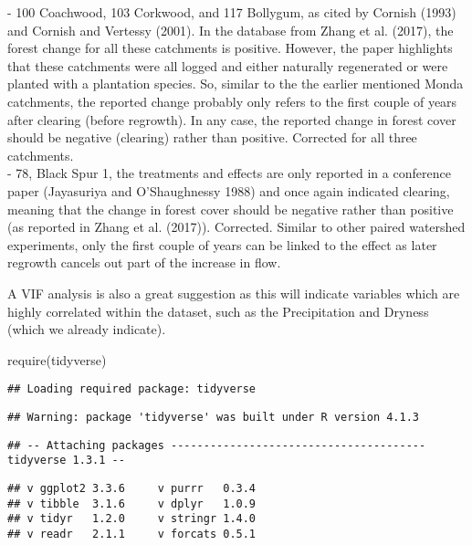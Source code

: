\documentclass[]{elsarticle} %
\newenvironment{Shaded}{\begin{snugshade}}{\end{snugshade}}
\newcommand{\FunctionTok}[1]{\textcolor[rgb]{0.00,0.00,0.00}{#1}}
\newcommand{\NormalTok}[1]{#1}
\begin{document}
- 100 Coachwood, 103 Corkwood, and 117 Bollygum, as cited by Cornish (1993) and Cornish and Vertessy (2001). In the database from Zhang et al. (2017), the forest change for all these catchments is positive. However, the paper highlights that these catchments were all logged and either naturally regenerated or were planted with a plantation species. So, similar to the the earlier mentioned Monda catchments, the reported change probably only refers to the first couple of years after clearing (before regrowth). In any case, the reported change in forest cover should be negative (clearing) rather than positive. Corrected for all three catchments.\\
- 78, Black Spur 1, the treatments and effects are only reported in a conference paper (Jayasuriya and O'Shaughnessy 1988) and once again indicated clearing, meaning that the change in forest cover should be negative rather than positive (as reported in Zhang et al. (2017)). Corrected. Similar to other paired watershed experiments, only the first couple of years can be linked to the effect as later regrowth cancels out part of the increase in flow.

A VIF analysis is also a great suggestion as this will indicate variables which are highly correlated within the dataset, such as the Precipitation and Dryness (which we already indicate).

\begin{Shaded}
\begin{Highlighting}[]
\FunctionTok{require}\NormalTok{(tidyverse)}
\end{Highlighting}
\end{Shaded}

\begin{verbatim}
## Loading required package: tidyverse
\end{verbatim}

\begin{verbatim}
## Warning: package 'tidyverse' was built under R version 4.1.3
\end{verbatim}

\begin{verbatim}
## -- Attaching packages --------------------------------------- tidyverse 1.3.1 --
\end{verbatim}

\begin{verbatim}
## v ggplot2 3.3.6     v purrr   0.3.4
## v tibble  3.1.6     v dplyr   1.0.9
## v tidyr   1.2.0     v stringr 1.4.0
## v readr   2.1.1     v forcats 0.5.1
\end{verbatim}
\end{document}
